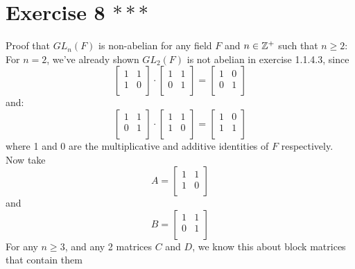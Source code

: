 \documentclass[12pt]{article}
\begin{document}
    \section*{Exercise 8 $***$}
    Proof that $GL_n(F)$ is non-abelian for any field $F$
    and $n \in \mathbb{Z}^+$ such that $n \geqslant 2$: \\
    For $n = 2$, we've already shown $GL_2(F)$ is not abelian in exercise
    1.1.4.3, since  
    \[ \begin{bmatrix}
        1 & 1 \\
        1 & 0 \\
    \end{bmatrix} \cdot
    \begin{bmatrix}
        1 & 1 \\
        0 & 1 \\
    \end{bmatrix}
    = \begin{bmatrix}
        1 & 0 \\
        0 & 1 \\
    \end{bmatrix} \]
    and: 
    \[ \begin{bmatrix}
        1 & 1 \\
        0 & 1 \\
    \end{bmatrix} \cdot
    \begin{bmatrix}
        1 & 1 \\
        1 & 0 \\
    \end{bmatrix}
    = \begin{bmatrix}
        1 & 0 \\
        1 & 1 \\
    \end{bmatrix} \]
    where 1 and 0 are the multiplicative and additive identities of
    $F$ respectively. \\
    Now take 
    \[ A = \begin{bmatrix}
        1 & 1 \\
        1 & 0 \\
    \end{bmatrix}\]
    and
    \[ B = \begin{bmatrix}
        1 & 1 \\
        0 & 1 \\
    \end{bmatrix} \]
    For any $n \geqslant 3$,
    and any 2 matrices $C$ and $D$,
    we know this about block matrices that contain them
\end{document}

